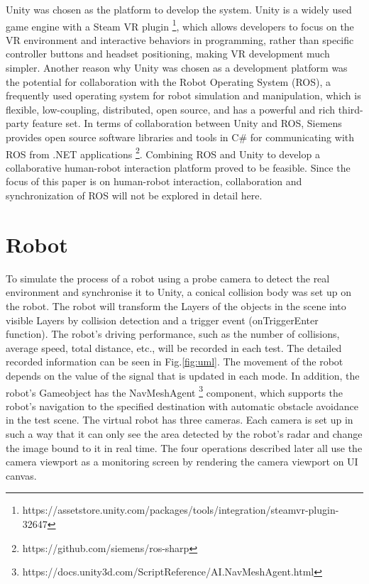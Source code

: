 Unity was chosen as the platform to develop the system. Unity is a widely used game engine with a Steam VR plugin \footnote{https://assetstore.unity.com/packages/tools/integration/steamvr-plugin-32647}, which allows developers to focus on the VR environment and interactive behaviors in programming, rather than specific controller buttons and headset positioning, making VR development much simpler. Another reason why Unity was chosen as a development platform was the potential for collaboration with the Robot Operating System (ROS), a frequently used operating system for robot simulation and manipulation, which is flexible, low-coupling, distributed, open source, and has a powerful and rich third-party feature set. In terms of collaboration between Unity and ROS, Siemens provides open source software libraries and tools in C\# for communicating with ROS from .NET applications \footnote{https://github.com/siemens/ros-sharp}. Combining ROS and Unity to develop a collaborative human-robot interaction platform proved to be feasible\cite{Whitney:2018wk}. Since the focus of this paper is on human-robot interaction, collaboration and synchronization of ROS will not be explored in detail here.

\section{Robot}
To simulate the process of a robot using a probe camera to detect the real environment and synchronise it to Unity, a conical collision body was set up on the robot. The robot will transform the Layers of the objects in the scene into visible Layers by collision detection and a trigger event (onTriggerEnter function). The robot's driving performance, such as the number of collisions, average speed, total distance, etc., will be recorded in each test. The detailed recorded information can be seen in Fig.\ref{fig:uml}. The movement of the robot depends on the value of the signal that is updated in each mode. In addition, the robot's Gameobject has the NavMeshAgent \footnote{https://docs.unity3d.com/ScriptReference/AI.NavMeshAgent.html} component, which supports the robot's navigation to the specified destination with automatic obstacle avoidance in the test scene. The virtual robot has three cameras. Each camera is set up in such a way that it can only see the area detected by the robot's radar and change the image bound to it in real time. The four operations described later all use the camera viewport as a monitoring screen by rendering the camera viewport on UI canvas.


